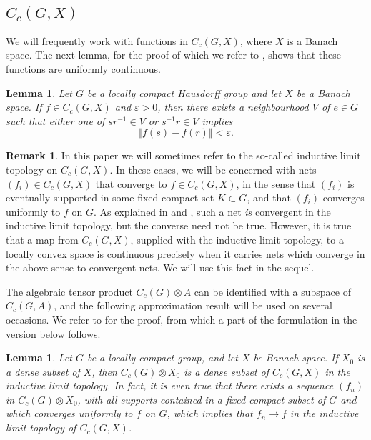 \documentclass{amsart}
\theoremstyle{plain}
\newtheorem{lemma}[theorem]{Lemma}
\theoremstyle{definition}
\newtheorem{remark}[theorem]{Remark}
\numberwithin{equation}{section}
\begin{document}
\subsection{$C_c(G,X)$}\label{subsec:C_c(G,X)}

We will frequently work with functions in $C_c(G,X)$, where $X$ is a Banach space. The next lemma, for the proof of which we refer to \cite[Lemma~1.88]{williams}, shows that these functions are uniformly continuous.

\begin{lemma}\label{l:uniformly_continuous}
 Let $G$ be a locally compact Hausdorff group and let $X$ be a Banach space. If $f \in C_c(G,X)$ and ${\varepsilon} > 0$, then there exists a neighbourhood $V$ of $e \in G$ such that either one of $sr^{-1} \in V$ or $s^{-1}r \in V$ implies
\[ {\left\Vert {f(s) - f(r)} \right\Vert} < {\varepsilon}. \]
\end{lemma}

\begin{remark}
In this paper we will sometimes refer to the so-called inductive limit topology on $C_c(G,X)$. In these cases, we will be concerned with nets $(f_i) \in C_c(G,X)$ that converge to $f \in C_c(G,X)$, in the sense that $(f_i)$ is eventually supported in some fixed compact set $K \subset G$, and that $(f_i)$ converges uniformly to $f$ on $G$. As explained in \cite[Remark~1.86]{williams} and \cite[Appendix~D.2]{raeburnwilliams}, such a net \emph{is} convergent in the inductive limit topology, but the converse need not be true. However, it is true that a map from $C_c(G,X)$, supplied with the inductive limit topology, to a locally convex space is continuous precisely when it carries nets which converge in the above sense to convergent nets. We will use this fact in the sequel.
\end{remark}

The algebraic tensor product $C_c(G) \otimes A$ can be identified with a subspace of $C_c(G,A)$, and the following approximation result will be used on several occasions. We refer to \cite[Lemma~1.87]{williams} for the proof, from which a part of the formulation in the version below follows.

\begin{lemma}\label{l:density_lemma_inductive_limit_topology}
Let $G$ be a locally compact group, and let $X$ be Banach space. If $X_0$ is a dense subset of $X$, then $C_c(G)\otimes X_0$ is a dense subset of $C_c(G,X)$ in the inductive limit topology. In fact, it is even true that there exists a sequence $(f_n)$ in $C_c(G)\otimes X_0$, with all supports contained in a fixed compact subset of $G$ and which converges uniformly to $f$ on $G$, which implies that $f_n\to f$ in the inductive limit topology of $C_c(G,X)$.
\end{lemma}
\end{document}
